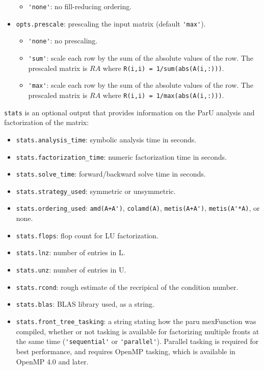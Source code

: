 \documentclass[12pt]{article}
\begin{document}
\begin{itemize}
\begin{itemize}
        \item \verb"'none'": no fill-reducing ordering.

        \end{itemize}

    \item \verb'opts.prescale': prescaling the input matrix
        (default \verb"'max'").

        \begin{itemize}
        \item \verb"'none'": no prescaling.
        \item \verb"'sum'": scale each row by the sum of the absolute values
            of the row.  The prescaled matrix is $RA$ where
            \verb'R(i,i) = 1/sum(abs(A(i,:)))'.
        \item \verb"'max'": scale each row by the sum of the absolute values
            of the row.  The prescaled matrix is $RA$ where
            \verb'R(i,i) = 1/max(abs(A(i,:)))'.
        \end{itemize}

\end{itemize}

\verb'stats' is an optional output that provides information on the ParU
analysis and factorization of the matrix:

\begin{itemize}
    \item \verb'stats.analysis_time': symbolic analysis time in seconds.
    \item \verb'stats.factorization_time': numeric factorization time in
        seconds.
    \item \verb'stats.solve_time': forward/backward solve time in seconds.
    \item \verb'stats.strategy_used': symmetric or unsymmetric.
    \item \verb'stats.ordering_used':
        \verb"amd(A+A')", \verb"colamd(A)", \verb"metis(A+A')",
        \verb"metis(A'*A)", or none.
    \item \verb'stats.flops': flop count for LU factorization.
    \item \verb'stats.lnz': number of entries in L.
    \item \verb'stats.unz': number of entries in U.
    \item \verb'stats.rcond': rough estimate of the recripical of the condition
        number.
    \item \verb'stats.blas': BLAS library used, as a string.
    \item \verb'stats.front_tree_tasking': a string stating how the paru
    mexFunction was compiled, whether or not tasking is available for
    factorizing multiple fronts at the same time (\verb"'sequential'" or
    \verb"'parallel'").  Parallel tasking is required for best performance, and
    requires OpenMP tasking, which is available in OpenMP 4.0 and later.
\end{itemize}
\end{document}
